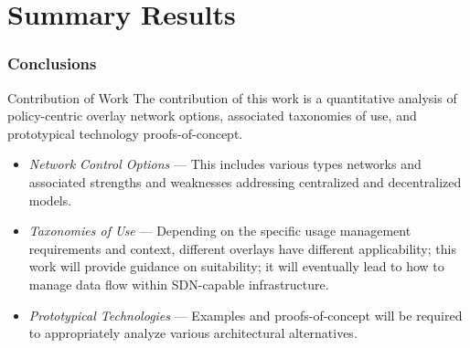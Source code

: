 \section{Summary Results}

\begin{frame}
\frametitle{Conclusions}
\begin{beamerboxesrounded}[shadow]{Contribution of Work}
The contribution of this work is a quantitative analysis of policy-centric overlay network options, associated taxonomies of use, and prototypical technology proofs-of-concept.
\end{beamerboxesrounded}
\begin{itemize}
\item \textit{Network Control Options} --- This includes various types networks and associated strengths and weaknesses addressing centralized and decentralized models.
\item \textit{Taxonomies of Use} --- Depending on the specific usage management requirements and context, different overlays have different applicability; this work will provide guidance on suitability; it will eventually lead to how to manage data flow within SDN-capable infrastructure.
\item \textit{Prototypical Technologies} --- Examples and proofs-of-concept will be required to appropriately analyze various architectural alternatives.
\end{itemize}
\end{frame}